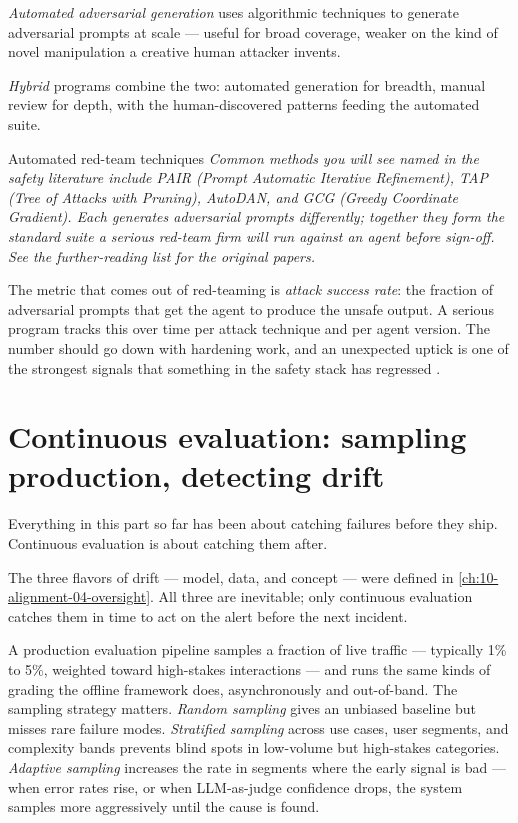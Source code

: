 \textit{Automated adversarial generation} uses algorithmic techniques to generate adversarial prompts at scale --- useful for broad coverage, weaker on the kind of novel manipulation a creative human attacker invents.

\textit{Hybrid} programs combine the two: automated generation for breadth, manual review for depth, with the human-discovered patterns feeding the automated suite.

\begin{TNinpractice}{Automated red-team techniques}
\textit{Common methods you will see named in the safety literature include PAIR (Prompt Automatic Iterative Refinement), TAP (Tree of Attacks with Pruning), AutoDAN, and GCG (Greedy Coordinate Gradient). Each generates adversarial prompts differently; together they form the standard suite a serious red-team firm will run against an agent before sign-off. See the further-reading list for the original papers.}
\end{TNinpractice}

The metric that comes out of red-teaming is \textit{attack success rate}: the fraction of adversarial prompts that get the agent to produce the unsafe output. A serious program tracks this over time per attack technique and per agent version. The number should go down with hardening work, and an unexpected uptick is one of the strongest signals that something in the safety stack has regressed \citep{perez2022redteam, inan2023llamaguard}.

\section{Continuous evaluation: sampling production, detecting drift}

Everything in this part so far has been about catching failures before they ship. Continuous evaluation is about catching them after.

The three flavors of drift --- model, data, and concept --- were defined in \autoref{ch:10-alignment-04-oversight}. All three are inevitable; only continuous evaluation catches them in time to act on the alert before the next incident.

A production evaluation pipeline samples a fraction of live traffic --- typically 1\% to 5\%, weighted toward high-stakes interactions --- and runs the same kinds of grading the offline framework does, asynchronously and out-of-band. The sampling strategy matters. \textit{Random sampling} gives an unbiased baseline but misses rare failure modes. \textit{Stratified sampling} across use cases, user segments, and complexity bands prevents blind spots in low-volume but high-stakes categories. \textit{Adaptive sampling} increases the rate in segments where the early signal is bad --- when error rates rise, or when LLM-as-judge confidence drops, the system samples more aggressively until the cause is found.

